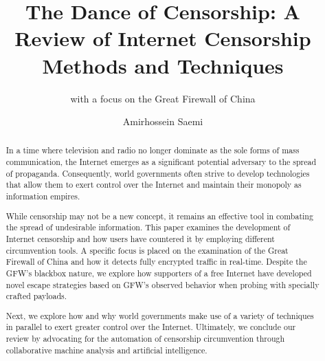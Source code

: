 \documentclass[10pt,sigconf]{acmart}
\begin{document}
\title{The Dance of Censorship: A Review of Internet Censorship Methods and Techniques}

\subtitle{with a focus on the Great Firewall of China}
 \author{Amirhossein Saemi}


\begin{abstract}
In a time where television and radio no longer dominate as the sole forms of mass communication, the Internet emerges as a significant potential adversary to the spread of propaganda. Consequently, world governments often strive to develop technologies that allow them to exert control over the Internet and maintain their monopoly as information empires. 

While censorship may not be a new concept, it remains an effective tool in combating the spread of undesirable information. This paper examines the development of Internet censorship and how users have countered it by employing different circumvention tools. A specific focus is placed on the examination of the Great Firewall of China and how it detects fully encrypted traffic in real-time. Despite the GFW's blackbox nature, we explore how supporters of a free Internet have developed novel escape strategies based on GFW's observed behavior when probing with specially crafted payloads.

Next, we explore how and why world governments make use of a variety of techniques in parallel to exert greater control over the Internet. Ultimately, we conclude our review by advocating for the automation of censorship circumvention through collaborative machine analysis and artificial intelligence.
\end{abstract}

\maketitle





\end{document}
